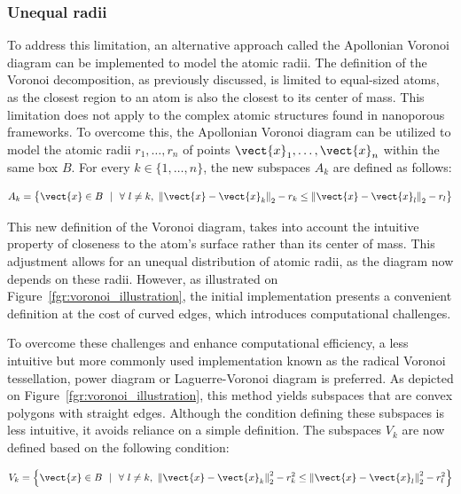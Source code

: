 \documentclass[main]{subfiles}
\begin{document}
\subsubsection{Unequal radii}

To address this limitation, an alternative approach called the Apollonian Voronoi diagram can be implemented to model the atomic radii. The definition of the Voronoi decomposition, as previously discussed, is limited to equal-sized atoms, as the closest region to an atom is also the closest to its center of mass. This limitation does not apply to the complex atomic structures found in nanoporous frameworks. To overcome this, the Apollonian Voronoi diagram\autocite{voronoi_apollonian} can be utilized to model the atomic radii $r_1,\ldots,r_n$ of points $\vect{x}_1,\ldots,\vect{x}_n$ within the same box $B$. For every $k\in\{1,\ldots,n\}$, the new subspaces $A_{k}$ are defined as follows:

\begin{equation}\label{eq:r_voronoi_apollonian}
  A_{k} = \left\{\vect{x} \in B\ \ |\ \ \forall\ l\neq k,\ {\lVert \vect{x}-\vect{x}_k \rVert}_2 - r_k \leq {\lVert \vect{x}-\vect{x}_l \rVert}_2 - r_l \right\}
\end{equation}

This new definition of the Voronoi diagram, takes into account the intuitive property of closeness to the atom's surface rather than its center of mass. This adjustment allows for an unequal distribution of atomic radii, as the diagram now depends on these radii. However, as illustrated on Figure~\ref{fgr:voronoi_illustration}, the initial implementation presents a convenient definition at the cost of curved edges, which introduces computational challenges.

To overcome these challenges and enhance computational efficiency, a less intuitive but more commonly used implementation known as the radical Voronoi tessellation, power diagram or Laguerre-Voronoi diagram\autocite{aurenhammer_1987} is preferred. As depicted on Figure~\ref{fgr:voronoi_illustration}, this method yields subspaces that are convex polygons with straight edges. Although the condition defining these subspaces is less intuitive, it avoids reliance on a simple definition. The subspaces $V_k$ are now defined based on the following condition:

\begin{equation}\label{eq:r_voronoi_radical}
    V_{k} = \left\{\vect{x} \in B\ \ |\ \ \forall\ l\neq k,\ {\lVert \vect{x}-\vect{x}_k \rVert}_2^2 - r_k^2 \leq {\lVert \vect{x}-\vect{x}_l \rVert}_2^2 - r_l^2 \right\}
  \end{equation}
\end{document}
